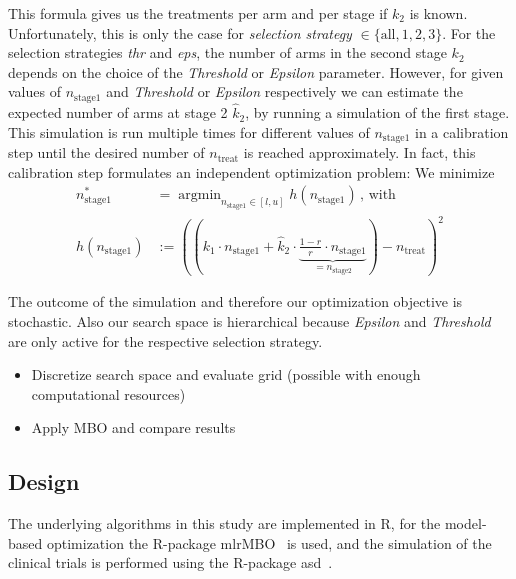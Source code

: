 \documentclass[bimj,fleqn]{w-art}
\theoremstyle{plain}
\theoremstyle{definition}
\begin{document}
This formula gives us the treatments per arm and per stage if $k_2$ is known. 
Unfortunately, this is only the case for \emph{selection strategy} $\in \{\text{all},1,2,3\}$.
For the selection strategies \emph{thr} and \emph{eps}, the number of arms in the second stage $k_2$ depends on the choice of the \emph{Threshold} or \emph{Epsilon} parameter.
However, for given values of $n_{\text{stage1}}$ and \emph{Threshold} or \emph{Epsilon} respectively we can estimate the expected number of arms at stage 2 $\hat{k}_2$, by running a simulation of the first stage.
This simulation is run multiple times for different values of $n_{\text{stage1}}$ in a calibration step until the desired number of $n_{\text{treat}}$ is reached approximately.
In fact, this calibration step formulates an independent optimization problem:
We minimize 
\begin{align}
  \label{eq:targettreat}
  n_{\text{stage1}}^\ast &= \operatorname{argmin}_{n_{\text{stage1}} \in [l,u]} h(n_{\text{stage1}}) \,  \text{, with} \\
  h(n_{\text{stage1}}) &:= \left( (k_1 \cdot n_{\text{stage1}} + \hat{k}_2 \cdot \underbrace{\frac{1-r}{r} \cdot n_{\text{stage1}}}_{=n_{\text{stage2}}}) - n_{\text{treat}} \right)^2 
\end{align}




The outcome of the simulation and therefore our optimization objective is stochastic.
Also our search space is hierarchical because \emph{Epsilon} and \emph{Threshold} are only active for the respective selection strategy.





\begin{itemize}
  \item Discretize search space and evaluate grid (possible with enough computational resources)
  \item Apply MBO and compare results
\end{itemize}



\subsection{Design}

The underlying algorithms in this study are implemented in R, for the model-based optimization the R-package mlrMBO~\citep{bischl_mlrmbo_2017} is used, and the simulation of the clinical trials is performed using the R-package asd~\citep{parsons_software_2011}.
\end{document}
